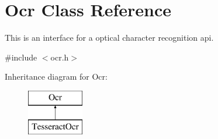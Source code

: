 \hypertarget{classOcr}{}\section{Ocr Class Reference}
\label{classOcr}


This is an interface for a optical character recognition api.  




{\ttfamily \#include $<$ocr.\+h$>$}

Inheritance diagram for Ocr\+:\begin{figure}[H]
\begin{center}
\leavevmode
\includegraphics[height=2.000000cm]{classOcr}
\end{center}
\end{figure}
